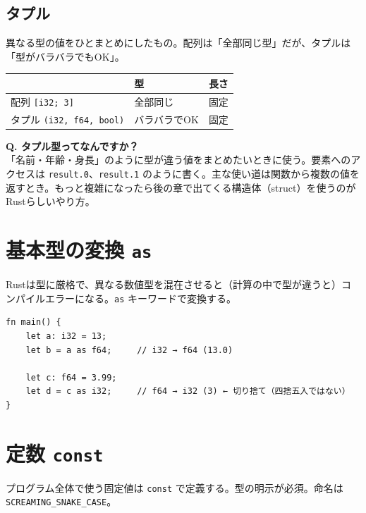 \documentclass[12pt,a4paper]{article}
\begin{document}
\subsection*{タプル}

異なる型の値をひとまとめにしたもの。配列は「全部同じ型」だが、タプルは「型がバラバラでもOK」。

\begin{center}
\begin{tabular}{lll}
\toprule
& \textbf{型} & \textbf{長さ} \\
\midrule
配列 \texttt{[i32; 3]}       & 全部同じ & 固定 \\
タプル \texttt{(i32, f64, bool)} & バラバラでOK & 固定 \\
\bottomrule
\end{tabular}
\end{center}

\begin{qabox}
\textbf{Q. タプル型ってなんですか？}\\
「名前・年齢・身長」のように型が違う値をまとめたいときに使う。要素へのアクセスは \texttt{result.0}、\texttt{result.1} のように書く。主な使い道は関数から複数の値を返すとき。もっと複雑になったら後の章で出てくる構造体（struct）を使うのがRustらしいやり方。
\end{qabox}

\section{基本型の変換 \texttt{as}}

Rustは型に厳格で、異なる数値型を混在させると（計算の中で型が違うと）コンパイルエラーになる。\texttt{as} キーワードで変換する。

\begin{lstlisting}
fn main() {
    let a: i32 = 13;
    let b = a as f64;     // i32 → f64 (13.0)

    let c: f64 = 3.99;
    let d = c as i32;     // f64 → i32 (3) ← 切り捨て（四捨五入ではない）
}
\end{lstlisting}

\section{定数 \texttt{const}}

プログラム全体で使う固定値は \texttt{const} で定義する。型の明示が必須。命名は \texttt{SCREAMING\_SNAKE\_CASE}。
\end{document}
